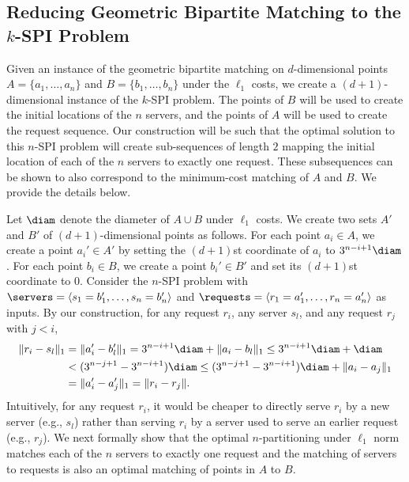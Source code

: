 %

\subsection{Reducing Geometric Bipartite Matching to the \texorpdfstring{$k$}{}-SPI Problem}\label{sec:reduction}

Given an instance of the geometric bipartite matching on $d$-dimensional points $A=\{a_1,\ldots, a_n\}$ and $B=\{b_1,\ldots, b_n\}$ under the $\ell_1$ costs, we create a $(d+1)$-dimensional instance of the $k$-SPI problem. The points of $B$ will be used to create the initial locations of the $n$ servers, and the points of $A$ will be used to create the request sequence. Our construction will be such that the optimal solution to this $n$-SPI problem will create sub-sequences of length $2$ mapping the initial location of each of the $n$ servers to exactly one request. These subsequences can be shown to also correspond to the minimum-cost matching of $A$ and $B$. We provide the details below. 

Let $\diam$ denote the diameter of $A\cup B$ under $\ell_1$ costs. We create two sets $A'$ and $B'$ of $(d+1)$-dimensional points as follows. For each point $a_i \in A$, we create a point $a_i' \in A'$ by setting the $(d+1)$st coordinate of $a_i$ to $3^{n-i+1}\diam$. For each point $b_i \in B$, we create a point $b_i' \in B'$ and set its $(d+1)$st coordinate to $0$. Consider the $n$-SPI problem with $\servers=\langle s_1=b_1',\ldots, s_n=b_n'\rangle$ and $\requests=\langle r_1=a_1',\ldots, r_n=a_n'\rangle$ as inputs. By our construction, for any request $r_i$, any server $s_l$, and any request $r_j$ with $j<i$,
\begin{align}
    \|r_i- s_l\|_1 &= \|a'_i- b'_l\|_1 = 3^{n-i+1}\diam + \|a_i- b_l\|_1\le 3^{n-i+1}\diam + \diam \nonumber \\&<  (3^{n-j+1}-3^{n-i+1})\diam \le (3^{n-j+1}-3^{n-i+1})\diam + \|a_i- a_j\|_1 \nonumber \\&= \|a'_i- a'_j\|_1= \|r_i-r_j\|.\label{eq:distance-EBM}
\end{align}
Intuitively, for any request $r_i$, it would be cheaper to directly serve $r_i$ by a new server (e.g., $s_l$) rather than serving $r_i$ by a server used to serve an earlier request (e.g., $r_j$).
We next formally show that the optimal $n$-partitioning under $\ell_1$ norm matches each of the $n$ servers to exactly one request and the matching of servers to requests is also an optimal matching of points in $A$ to $B$. 

